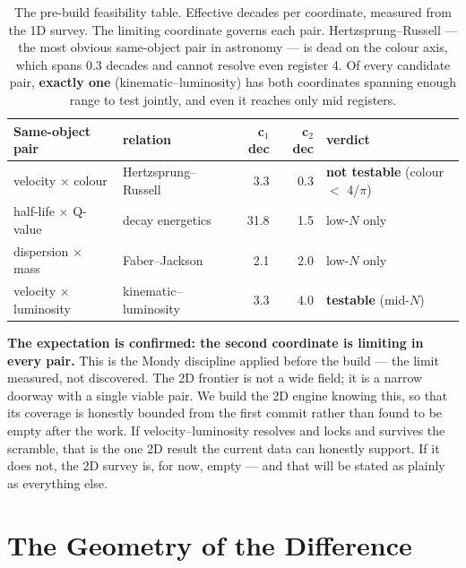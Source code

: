 \documentclass[11pt, letterpaper, openany]{book}
\begin{document}
\begin{table}[H]
\centering
\small
\begin{tabular}{@{}llrr l@{}}
\toprule
\textbf{Same-object pair} & \textbf{relation} & \textbf{c$_1$ dec} & \textbf{c$_2$ dec} & \textbf{verdict} \\
\midrule
velocity $\times$ colour & Hertzsprung--Russell & 3.3 & 0.3 & \textbf{not testable} (colour $<$ 4/$\pi$) \\
half-life $\times$ Q-value & decay energetics & 31.8 & 1.5 & low-$N$ only \\
dispersion $\times$ mass & Faber--Jackson & 2.1 & 2.0 & low-$N$ only \\
velocity $\times$ luminosity & kinematic--luminosity & 3.3 & 4.0 & \textbf{testable} (mid-$N$) \\
\bottomrule
\end{tabular}
\caption{The pre-build feasibility table. Effective decades per coordinate, measured from the 1D
survey. The limiting coordinate governs each pair. Hertzsprung--Russell --- the most obvious
same-object pair in astronomy --- is dead on the colour axis, which spans 0.3 decades and cannot
resolve even register 4. Of every candidate pair, \textbf{exactly one} (kinematic--luminosity)
has both coordinates spanning enough range to test jointly, and even it reaches only mid
registers.}
\end{table}

\begin{warningbox}
\textbf{The expectation is confirmed: the second coordinate is limiting in every pair.} This is
the Mondy discipline applied before the build --- the limit measured, not discovered. The 2D
frontier is not a wide field; it is a narrow doorway with a single viable pair. We build the 2D
engine knowing this, so that its coverage is honestly bounded from the first commit rather than
found to be empty after the work. If velocity--luminosity resolves and locks and survives the
scramble, that is the one 2D result the current data can honestly support. If it does not, the 2D
survey is, for now, empty --- and that will be stated as plainly as everything else.
\end{warningbox}

\section{The Geometry of the Difference}
\end{document}
